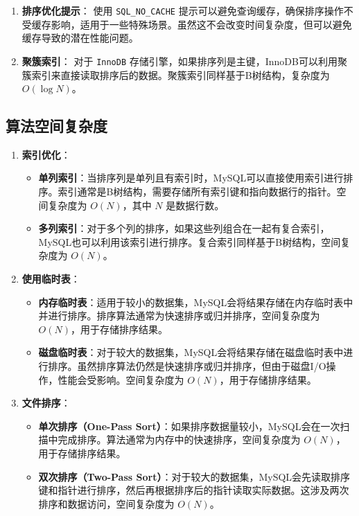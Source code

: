 \documentclass{report}
\begin{document}
\begin{enumerate}
    \item \textbf{排序优化提示}：
    使用 \verb|SQL_NO_CACHE| 提示可以避免查询缓存，确保排序操作不受缓存影响，适用于一些特殊场景。虽然这不会改变时间复杂度，但可以避免缓存导致的潜在性能问题。
    
    \item \textbf{聚簇索引}：
    对于 \verb|InnoDB| 存储引擎，如果排序列是主键，InnoDB可以利用聚簇索引来直接读取排序后的数据。聚簇索引同样基于B树结构，复杂度为 $O(\log N)$。
\end{enumerate}
\subsection{算法空间复杂度}
\begin{enumerate}
    \item \textbf{索引优化}：
    \begin{itemize}
        \item \textbf{单列索引}：当排序列是单列且有索引时，MySQL可以直接使用索引进行排序。索引通常是B树结构，需要存储所有索引键和指向数据行的指针。空间复杂度为 $O(N)$，其中 $N$ 是数据行数。
        \item \textbf{多列索引}：对于多个列的排序，如果这些列组合在一起有复合索引，MySQL也可以利用该索引进行排序。复合索引同样基于B树结构，空间复杂度为 $O(N)$。
    \end{itemize}
    
    \item \textbf{使用临时表}：
    \begin{itemize}
        \item \textbf{内存临时表}：适用于较小的数据集，MySQL会将结果存储在内存临时表中并进行排序。排序算法通常为快速排序或归并排序，空间复杂度为 $O(N)$，用于存储排序结果。
        \item \textbf{磁盘临时表}：对于较大的数据集，MySQL会将结果存储在磁盘临时表中进行排序。虽然排序算法仍然是快速排序或归并排序，但由于磁盘I/O操作，性能会受影响。空间复杂度为 $O(N)$，用于存储排序结果。
    \end{itemize}
    
    \item \textbf{文件排序}：
    \begin{itemize}
        \item \textbf{单次排序（One-Pass Sort）}：如果排序数据量较小，MySQL会在一次扫描中完成排序。算法通常为内存中的快速排序，空间复杂度为 $O(N)$，用于存储排序结果。
        \item \textbf{双次排序（Two-Pass Sort）}：对于较大的数据集，MySQL会先读取排序键和指针进行排序，然后再根据排序后的指针读取实际数据。这涉及两次排序和数据访问，空间复杂度为 $O(N)$。
    \end{itemize}
    

\end{enumerate}
\end{document}
